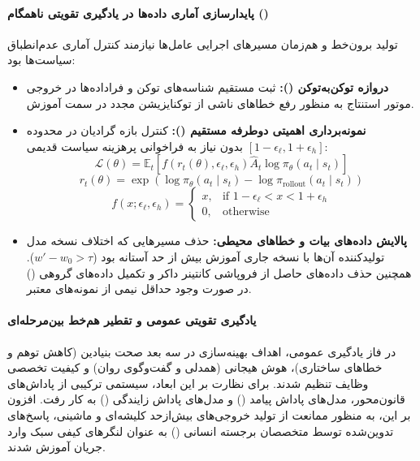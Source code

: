 \paragraph*{پایدارسازی آماری داده‌ها در یادگیری تقویتی ناهمگام ()}
تولید برون‌خط و هم‌زمان مسیرهای اجرایی عامل‌ها نیازمند کنترل آماری عدم‌انطباق سیاست‌ها بود:
\begin{itemize}
    \item \textbf{دروازه توکن‌به‌توکن ():} ثبت مستقیم شناسه‌های توکن و فراداده‌ها در خروجی موتور استنتاج به منظور رفع خطاهای ناشی از توکنایزیشن مجدد در سمت آموزش.
    \item \textbf{نمونه‌برداری اهمیتی دوطرفه مستقیم ():} کنترل بازه گرادیان در محدوده $[1-\epsilon_\ell, 1+\epsilon_h]$ بدون نیاز به فراخوانی پرهزینه سیاست قدیمی:
    \begin{equation}
        \mathcal{L}(\theta) = \mathbb{E}_t \left[ f(r_t(\theta), \epsilon_\ell, \epsilon_h) \hat{A}_t \log \pi_\theta(a_t \mid s_t) \right]
    \end{equation}
    \begin{equation}
        r_t(\theta) = \exp \left( \log \pi_\theta(a_t \mid s_t) - \log \pi_{\text{rollout}}(a_t \mid s_t) \right)
    \end{equation}
    \begin{equation}
        f(x; \epsilon_\ell, \epsilon_h) = \begin{cases} x, & \text{if } 1 - \epsilon_\ell < x < 1 + \epsilon_h \\ 0, & \text{otherwise} \end{cases}
    \end{equation}
    \item \textbf{پالایش داده‌های بیات و خطاهای محیطی:} حذف مسیرهایی که اختلاف نسخه مدل تولیدکننده آن‌ها با نسخه جاری آموزش بیش از حد آستانه بود ($w' - w_0 > \tau$). همچنین حذف داده‌های حاصل از فروپاشی کانتینر داکر و تکمیل داده‌های گروهی () در صورت وجود حداقل نیمی از نمونه‌های معتبر.
\end{itemize}

\paragraph*{یادگیری تقویتی عمومی و تقطیر هم‌خط بین‌مرحله‌ای}
در فاز یادگیری عمومی، اهداف بهینه‌سازی در سه بعد صحت بنیادین (کاهش توهم و خطاهای ساختاری)، هوش هیجانی (همدلی و گفت‌وگوی روان) و کیفیت تخصصی وظایف تنظیم شدند. برای نظارت بر این ابعاد، سیستمی ترکیبی از پاداش‌های قانون‌محور، مدل‌های پاداش پیامد () و مدل‌های پاداش زایندگی () به کار رفت. افزون بر این، به منظور ممانعت از تولید خروجی‌های بیش‌ازحد کلیشه‌ای و ماشینی، پاسخ‌های تدوین‌شده توسط متخصصان برجسته انسانی () به عنوان لنگرهای کیفی سبک وارد جریان آموزش شدند.

